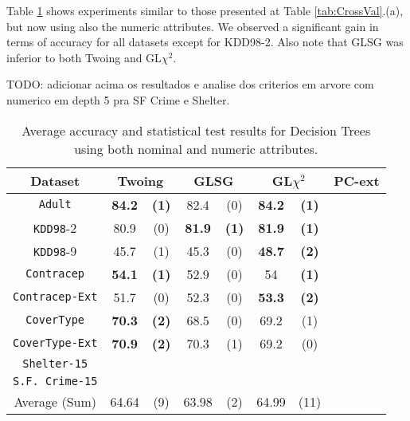 Table \ref{exp:secondsetnumeric} shows experiments  similar to those presented at Table \ref{tab:CrossVal}.(a), but now
using also the numeric attributes. We observed a significant gain in terms of accuracy for all datasets except for KDD98-2. 
Also note that GLSG was inferior to both Twoing and GL$\chi^2$.

TODO: adicionar acima os resultados e analise dos criterios em arvore com numerico em depth 5 pra SF Crime e Shelter.

\begin{table}
\small
\caption{Average accuracy and statistical test results for  Decision Trees using both nominal and numeric attributes.}
\centering
\begin{tabular}{c|cc|cc|cc|cc} 
Dataset &        \multicolumn{2}{c|}{Twoing} &   \multicolumn{2}{c|}{GLSG} &   \multicolumn{2}{c|}{GL$\chi^2$} & \multicolumn{2}{c}{PC-ext}\\  \hline   
{\tt Adult}      &   {\bf 84.2 }  & {\bf (1) }    & 82.4  & (0)   &  {\bf 84.2} & {\bf (1) }  & &      \\
{\tt KDD98}-2      & 80.9   & (0)      & {\bf 81.9 }& {\bf (1)}   & {\bf 81.9}  & {\bf (1)}   & &     \\ 
{\tt KDD98}-9      & 45.7 &   (1)    & 45.3 &  (0)  & {\bf 48.7 }  &{\bf  (2)  }       & & \\ 
{\tt Contracep}  &{\bf  54.1  }&{\bf   (1)}      & 52.9   &  (0)  & 54    &{\bf  (1) }   & &  \\ 
{\tt Contracep-Ext}  & 51.7  &  (0)      & 52.3   &  (0) & {\bf 53.3 }   & {\bf (2) }   & & \\ 
{\tt CoverType}  &  {\bf 70.3 } &  {\bf  (2) }   &   68.5  &  (0)   &   69.2   &  (1)    & &  \\ 
{\tt CoverType-Ext}  & {\bf 70.9}   & {\bf (2) }     &  70.3    &  (1)  &  69.2     & (0)    & &  \\ 
{\tt Shelter-15}   &    &   &  &   &   &    &  &      \\   
{\tt S.F. Crime-15} &  &  & &  & & & &    \\ 
\hline
Average (Sum)  & 64.64  &  (9)  & 63.98  &  (2)   &   64.99   &  (11) &  &

\end{tabular}
\label{exp:secondsetnumeric}
\normalsize
\end{table}


